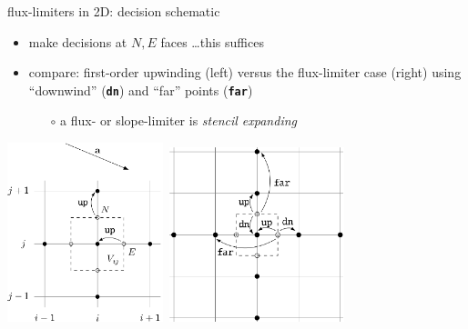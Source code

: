 \documentclass[10pt,dvipsnames,usepdftitle=false,
hyperref={pdftitle = {Finite volume methods},
    pdfauthor = {Ed Bueler}}]{beamer}
\begin{document}
\begin{frame}{flux-limiters in 2D: decision schematic}

\begin{itemize}
\item make decisions at $N,E$ faces \dots this suffices
\item compare: first-order upwinding (left) versus the flux-limiter case (right) using ``downwind'' (\textbf{\texttt{dn}}) and ``far'' points (\textbf{\texttt{far}})
    \begin{itemize}
    \item[$\circ$] a flux- or slope-limiter is \emph{stencil expanding}
    \end{itemize}
\end{itemize}

\bigskip
\quad \mbox{\includegraphics[width=0.34\textwidth]{figs/bueler11p8upwind} \hspace{15mm} \includegraphics[width=0.38\textwidth]{figs/bueler11p8fluxlimited}}
\end{frame}
\end{document}
